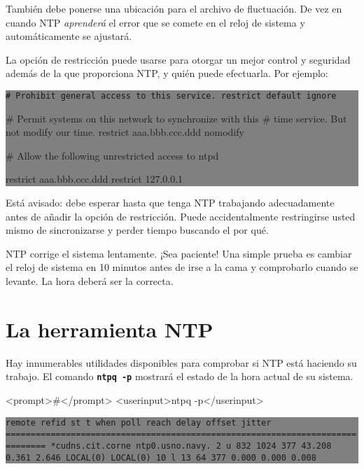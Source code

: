También debe ponerse una ubicación para el archivo de fluctuación. De 
vez en cuando NTP \textit{aprenderá} el error que se comete en el reloj de
sistema y automáticamente se ajustará.



La opción de restricción puede usarse para otorgar un mejor control y 
seguridad además de la que proporciona NTP, y quién puede efectuarla.
Por ejemplo:

\colorbox{grey}{\parbox[t]{0.95\linewidth}{ \vspace*{0.5cm} {\tt # Prohibit general access to this service.
restrict default ignore

# Permit systems on this network to synchronize with this
# time service. But not modify our time.
restrict aaa.bbb.ccc.ddd nomodify

# Allow the following unrestricted access to ntpd

restrict aaa.bbb.ccc.ddd
restrict 127.0.0.1
 } \vspace*{0.5cm} } } 


Está avisado: debe esperar hasta que tenga NTP trabajando adecuadamente 
antes de añadir la opción de restricción. Puede accidentalmente 
restringirse usted mismo de sincronizarse y perder tiempo buscando el por qué.



NTP corrige el sistema lentamente. ¡Sea paciente! Una simple prueba es
cambiar el reloj de sistema en 10 minutos antes de irse a la cama y
comprobarlo cuando se levante. La hora deberá ser la correcta.






\section{
La herramienta NTP}


Hay innumerables utilidades disponibles para comprobar si NTP está 
haciendo su trabajo. El comando \texttt{\textbf{ntpq -p}} mostrará el estado de la hora
actual de su sistema.


<prompt>#</prompt> <userinput>ntpq -p</userinput>
\colorbox{grey}{\parbox[t]{0.95\linewidth}{ \vspace*{0.5cm} {\tt      remote           refid      st t when poll reach   delay   offset  jitter
==============================================================================
*cudns.cit.corne ntp0.usno.navy.  2 u  832 1024  377   43.208    0.361   2.646
 LOCAL(0)        LOCAL(0)        10 l   13   64  377    0.000    0.000   0.008
 } \vspace*{0.5cm} } } 

